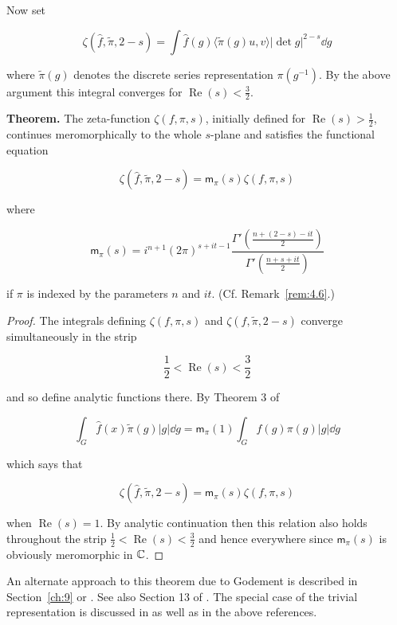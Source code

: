 Now set

\[
\zeta(\hat{f}, \widetilde{\pi}, 2 - s) = \int \hat{f}(g)\langle \widetilde{\pi}(g)u, v \rangle |\det g|^{2 - s} \dd g
\]

where $\widetilde{\pi}(g)$ denotes the discrete series representation $\pi(g^{-1})$. By the above argument this integral converges for $\operatorname{Re}(s) < \frac{3}{2}$.

\textbf{Theorem.} The zeta-function $\zeta(f, \pi, s)$, initially defined for $\operatorname{Re}(s) > \frac{1}{2}$, continues meromorphically to the whole $s$-plane and satisfies the functional equation

\[
\zeta(\hat{f}, \widetilde{\pi}, 2 - s) = \mathsf{m}_{\pi}(s)\zeta(f, \pi, s)
\]

where

\[
\mathsf{m}_{\pi}(s) = i^{n+1}(2\pi)^{s + it - 1} \frac{\Gamma'\left(\frac{n + (2 - s) - it}{2}\right)}{\Gamma'\left(\frac{n + s + it}{2}\right)}
\]

if $\pi$ is indexed by the parameters $n$ and $it$. (Cf. Remark~\ref{rem:4.6}.)

\begin{proof}

The integrals defining $\zeta(f, \pi, s)$ and $\zeta(f, \tilde{\pi}, 2-s)$ converge simultaneously in the strip

\[
\frac{1}{2} < \operatorname{Re}(s) < \frac{3}{2}
\]

and so define analytic functions there. By Theorem 3 of \cite{Gelbart}

\begin{equation}
\int_{G} \hat{f}(x)\widetilde{\pi}(g) |g| \dd g = \mathsf{m}_{\pi}(1) \int_{G} f(g)\pi(g) |g| \dd g\tag{**}
\end{equation}

which says that

\[
\zeta(\hat{f}, \widetilde{\pi}, 2 - s) = \mathsf{m}_{\pi}(s)\zeta(f, \pi, s)
\]

when $\operatorname{Re}(s) = 1$. By analytic continuation then this relation also holds throughout the strip $\frac{1}{2} < \operatorname{Re}(s) < \frac{3}{2}$ and hence everywhere since $\mathsf{m}_{\pi}(s)$ is obviously meromorphic in $\mathbb{C}$.

\end{proof}

An alternate approach to this theorem due to Godement is described in Section~\ref{ch:9} or \cite{GodementJacquet}. See also Section 13 of \cite{JacquetLanglands}. The special case of the trivial representation is discussed in \cite{Weil6} as well as in the above references.

